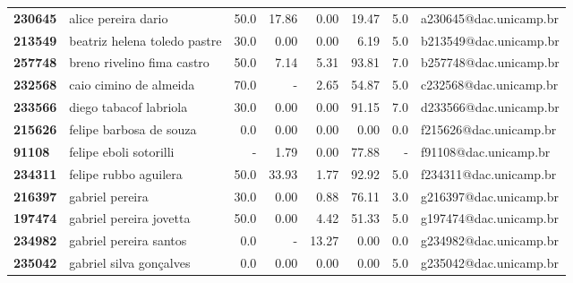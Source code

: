 \documentclass[11pt]{article}
\begin{document}
\begin{center}
\begin{landscape}
\begin{longtable}{llrrrrrl}
\bottomrule
\endlastfoot
\textbf{230645} &                    alice pereira dario &                  50.0 &       17.86 &        0.00 &       19.47 &                      5.0 &  a230645@dac.unicamp.br \\
\textbf{213549} &           beatriz helena toledo pastre &                  30.0 &        0.00 &        0.00 &        6.19 &                      5.0 &  b213549@dac.unicamp.br \\
\textbf{257748} &             breno rivelino fima castro &                  50.0 &        7.14 &        5.31 &       93.81 &                      7.0 &  b257748@dac.unicamp.br \\
\textbf{232568} &                 caio cimino de almeida &                  70.0 &           - &        2.65 &       54.87 &                      5.0 &  c232568@dac.unicamp.br \\
\textbf{233566} &                 diego tabacof labriola &                  30.0 &        0.00 &        0.00 &       91.15 &                      7.0 &  d233566@dac.unicamp.br \\
\textbf{215626} &                felipe barbosa de souza &                   0.0 &        0.00 &        0.00 &        0.00 &                      0.0 &  f215626@dac.unicamp.br \\
\textbf{91108 } &                 felipe eboli sotorilli &                     - &        1.79 &        0.00 &       77.88 &                        - &   f91108@dac.unicamp.br \\
\textbf{234311} &                  felipe rubbo aguilera &                  50.0 &       33.93 &        1.77 &       92.92 &                      5.0 &  f234311@dac.unicamp.br \\
\textbf{216397} &                        gabriel pereira &                  30.0 &        0.00 &        0.88 &       76.11 &                      3.0 &  g216397@dac.unicamp.br \\
\textbf{197474} &                gabriel pereira jovetta &                  50.0 &        0.00 &        4.42 &       51.33 &                      5.0 &  g197474@dac.unicamp.br \\
\textbf{234982} &                 gabriel pereira santos &                   0.0 &           - &       13.27 &        0.00 &                      0.0 &  g234982@dac.unicamp.br \\
\textbf{235042} &                gabriel silva gonçalves &                   0.0 &        0.00 &        0.00 &        0.00 &                      5.0 &  g235042@dac.unicamp.br \\

\end{longtable}
\end{landscape}
\end{center}
\end{document}
